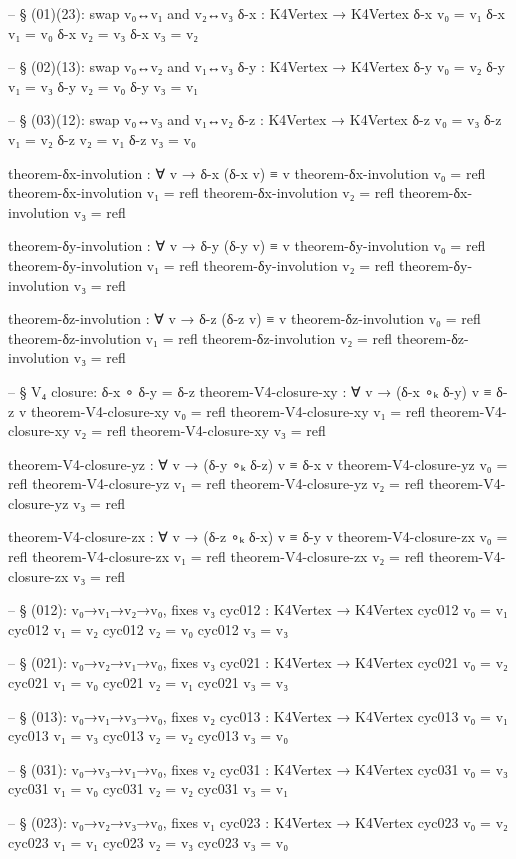 \documentclass[11pt,a4paper]{book}
\begin{document}
\begin{code}
-- § (01)(23): swap v₀↔v₁ and v₂↔v₃
δ-x : K4Vertex → K4Vertex
δ-x v₀ = v₁
δ-x v₁ = v₀
δ-x v₂ = v₃
δ-x v₃ = v₂

-- § (02)(13): swap v₀↔v₂ and v₁↔v₃
δ-y : K4Vertex → K4Vertex
δ-y v₀ = v₂
δ-y v₁ = v₃
δ-y v₂ = v₀
δ-y v₃ = v₁

-- § (03)(12): swap v₀↔v₃ and v₁↔v₂
δ-z : K4Vertex → K4Vertex
δ-z v₀ = v₃
δ-z v₁ = v₂
δ-z v₂ = v₁
δ-z v₃ = v₀

theorem-δx-involution : ∀ v → δ-x (δ-x v) ≡ v
theorem-δx-involution v₀ = refl
theorem-δx-involution v₁ = refl
theorem-δx-involution v₂ = refl
theorem-δx-involution v₃ = refl

theorem-δy-involution : ∀ v → δ-y (δ-y v) ≡ v
theorem-δy-involution v₀ = refl
theorem-δy-involution v₁ = refl
theorem-δy-involution v₂ = refl
theorem-δy-involution v₃ = refl

theorem-δz-involution : ∀ v → δ-z (δ-z v) ≡ v
theorem-δz-involution v₀ = refl
theorem-δz-involution v₁ = refl
theorem-δz-involution v₂ = refl
theorem-δz-involution v₃ = refl

-- § V₄ closure: δ-x ∘ δ-y = δ-z
theorem-V4-closure-xy : ∀ v → (δ-x ∘ₖ δ-y) v ≡ δ-z v
theorem-V4-closure-xy v₀ = refl
theorem-V4-closure-xy v₁ = refl
theorem-V4-closure-xy v₂ = refl
theorem-V4-closure-xy v₃ = refl

theorem-V4-closure-yz : ∀ v → (δ-y ∘ₖ δ-z) v ≡ δ-x v
theorem-V4-closure-yz v₀ = refl
theorem-V4-closure-yz v₁ = refl
theorem-V4-closure-yz v₂ = refl
theorem-V4-closure-yz v₃ = refl

theorem-V4-closure-zx : ∀ v → (δ-z ∘ₖ δ-x) v ≡ δ-y v
theorem-V4-closure-zx v₀ = refl
theorem-V4-closure-zx v₁ = refl
theorem-V4-closure-zx v₂ = refl
theorem-V4-closure-zx v₃ = refl

-- § (012): v₀→v₁→v₂→v₀, fixes v₃
cyc012 : K4Vertex → K4Vertex
cyc012 v₀ = v₁
cyc012 v₁ = v₂
cyc012 v₂ = v₀
cyc012 v₃ = v₃

-- § (021): v₀→v₂→v₁→v₀, fixes v₃
cyc021 : K4Vertex → K4Vertex
cyc021 v₀ = v₂
cyc021 v₁ = v₀
cyc021 v₂ = v₁
cyc021 v₃ = v₃

-- § (013): v₀→v₁→v₃→v₀, fixes v₂
cyc013 : K4Vertex → K4Vertex
cyc013 v₀ = v₁
cyc013 v₁ = v₃
cyc013 v₂ = v₂
cyc013 v₃ = v₀

-- § (031): v₀→v₃→v₁→v₀, fixes v₂
cyc031 : K4Vertex → K4Vertex
cyc031 v₀ = v₃
cyc031 v₁ = v₀
cyc031 v₂ = v₂
cyc031 v₃ = v₁

-- § (023): v₀→v₂→v₃→v₀, fixes v₁
cyc023 : K4Vertex → K4Vertex
cyc023 v₀ = v₂
cyc023 v₁ = v₁
cyc023 v₂ = v₃
cyc023 v₃ = v₀


\end{code}
\end{document}
